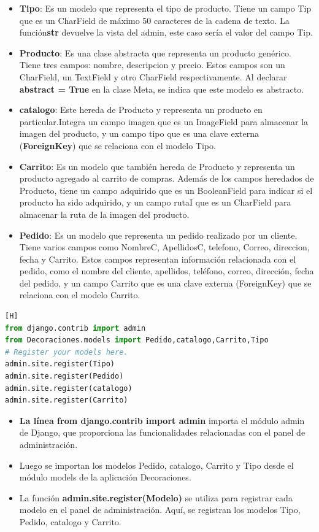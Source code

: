 \documentclass{article}
\begin{document}
	\begin{itemize}
	    \item \textbf{Tipo}: Es un modelo que representa el tipo de producto. Tiene un campo Tip que es un CharField de máximo 50 caracteres de la cadena de texto. La función\textbf{str} devuelve la vista del admin, este caso sería el valor del campo Tip.
        \item \textbf{Producto}: Es una clase abstracta que representa un producto genérico. Tiene tres campos: nombre, descripcion y precio. Estos campos son un CharField, un TextField y otro CharField respectivamente. Al declarar \textbf{abstract = True} en la clase Meta, se indica que este modelo es abstracto.
        \item \textbf{catalogo}: Este hereda de Producto y representa un producto en particular.Integra un campo imagen que es un ImageField para almacenar la imagen del producto, y un campo tipo que es una clave externa (\textbf{ForeignKey}) que se relaciona con el modelo Tipo.
        \item \textbf{Carrito}: Es un modelo que también hereda de Producto y representa un producto agregado al carrito de compras. Además de los campos heredados de Producto, tiene un campo adquirido que es un BooleanField para indicar si el producto ha sido adquirido, y un campo rutaI que es un CharField para almacenar la ruta de la imagen del producto.
        \item \textbf{Pedido}: Es un modelo que representa un pedido realizado por un cliente. Tiene varios campos como NombreC, ApellidosC, telefono, Correo, direccion, fecha y Carrito. Estos campos representan información relacionada con el pedido, como el nombre del cliente, apellidos, teléfono, correo, dirección, fecha del pedido, y un campo Carrito que es una clave externa (ForeignKey) que se relaciona con el modelo Carrito.
	\end{itemize}
     \begin{lstlisting}[language=python,caption={Decoraciones/models.py}][H]
from django.contrib import admin
from Decoraciones.models import Pedido,catalogo,Carrito,Tipo
# Register your models here.
admin.site.register(Tipo)
admin.site.register(Pedido)
admin.site.register(catalogo)
admin.site.register(Carrito)
    \end{lstlisting}
	\begin{itemize}
	    \item\textbf{La línea from django.contrib import admin} importa el módulo admin de Django, que proporciona las funcionalidades relacionadas con el panel de administración.
        \item Luego se importan los modelos Pedido, catalogo, Carrito y Tipo desde el módulo models de la aplicación Decoraciones.
        \item La función \textbf{admin.site.register(Modelo)} se utiliza para registrar cada modelo en el panel de administración. Aquí, se registran los modelos Tipo, Pedido, catalogo y Carrito.
	\end{itemize}
\end{document}
